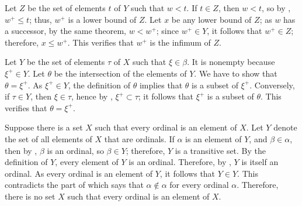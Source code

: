 \documentclass{article}
\begin{document}
\begin{solution}[\ref{exe:ylp1zcc8}]
  \label{sol:6szduuuo}
  Let \(Z\) be the set of elements \(t\) of \(Y\) such that \(w < t\).
  If \(t \in Z\), then \(w < t\), so by ,
  \(w^+ \leq t\); thus, \(w^+\) is a lower bound of \(Z\).  Let \(x\)
  be any lower bound of \(Z\); as \(w\) has a successor, by the same
  theorem, \(w < w^+\); since \(w^+ \in Y\), it follows that
  \(w^+ \in Z\); therefore, \(x \leq w^+\).  This verifies that
  \(w^+\) is the infimum of \(Z\).
\end{solution}

\begin{solution}[\ref{exe:ddc4bdfk}]
  \label{sol:knjkxl0v}
  Let \(Y\) be the set of elements \(\tau\) of \(X\) such that
  \(\xi \in \beta\).  It is nonempty because \(\xi^+ \in Y\).  Let
  \(\theta\) be the intersection of the elements of \(Y\).  We have to
  show that \(\theta = \xi^+\).  As \(\xi^+ \in Y\), the definition of
  \(\theta\) implies that \(\theta\) is a subset of \(\xi^+\).
  Conversely, if \(\tau \in Y\), then \(\xi \in \tau\), hence by
  , \(\xi^+ \subset \tau\); it follows that
  \(\xi^+\) is a subset of \(\theta\).  This verifies that
  \(\theta = \xi^+\).
\end{solution}

\begin{solution}[\ref{exe:9pk4eh7k}]
  \label{sol:s4fkzn20}
  Suppose there is a set \(X\) such that every ordinal is an element
  of \(X\).  Let \(Y\) denote the set of all elements of \(X\) that
  are ordinals.  If \(\alpha\) is an element of \(Y\), and
  \(\beta \in \alpha\), then by , \(\beta\) is an
  ordinal, so \(\beta \in Y\); therefore, \(Y\) is a transitive set.
  By the definition of \(Y\), every element of \(Y\) is an ordinal.
  Therefore, by , \(Y\) is itself an ordinal.  As
  every ordinal is an element of \(Y\), it follows that \(Y \in Y\).
  This contradicts the part of  which says that
  \(\alpha \notin \alpha\) for every ordinal \(\alpha\).  Therefore,
  there is no set \(X\) such that every ordinal is an element of
  \(X\).
\end{solution}
\end{document}
